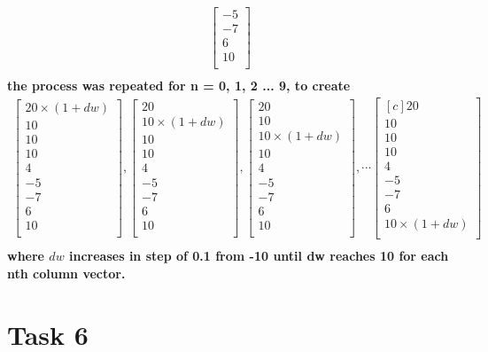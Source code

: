\documentclass[a4paper,11pt]{article}
\begin{document}
\begin{flushleft}
\begin{itemize}
\begin{align*}
\begin{bmatrix}
-5 \\
-7\\
6 \\
10\\
\end{bmatrix}\\
\end{align*}
\textbf{the process was repeated for n = 0, 1, 2 ... 9, to create}\\
\begin{align*}
\begin{bmatrix} 
20 \times \left( 1 + dw \right) \\
10 \\
10 \\
10 \\
4 \\
-5 \\
-7\\
6 \\
10\\
\end{bmatrix} , 
\begin{bmatrix} 
20 \\
10 \times \left( 1 + dw \right) \\
10 \\
10 \\
4 \\
-5 \\
-7\\
6 \\
10\\
\end{bmatrix} , 
\begin{bmatrix} 
20 \\
10 \\
10 \times \left( 1 + dw \right) \\
10 \\
4 \\
-5 \\
-7\\
6 \\
10\\
\end{bmatrix} , \cdots 
\begin{bmatrix}[c] 
20 \\
10 \\
10  \\
10 \\
4 \\
-5 \\
-7\\
6 \\
10 \times \left( 1 + dw \right) \\
\end{bmatrix} \\
\end{align*}
\textbf{where $dw$ increases in step of 0.1 from -10 until dw reaches 10 for each nth column vector. }\\
\end{itemize}

\section{Task 6}


\end{flushleft}
\end{document}
